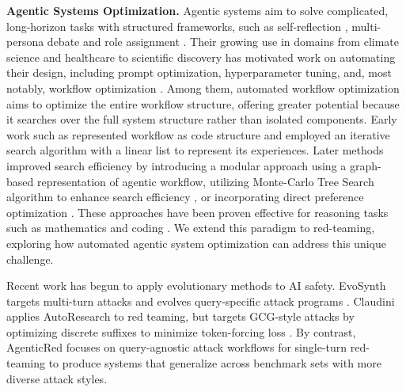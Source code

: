 

\textbf{Agentic Systems Optimization.} Agentic systems aim to solve complicated, long-horizon tasks with structured frameworks, such as self-reflection \citep{madaan2023selfrefineiterativerefinementselffeedback}, multi-persona debate \citep{du2023improvingfactualityreasoninglanguage} and role assignment \citep{xu2025expertpromptinginstructinglargelanguage}. %
Their growing use in domains from climate science and healthcare to scientific discovery has motivated work on automating their design, including prompt optimization, hyperparameter tuning, and, most notably, workflow optimization \citep{hou2025investesgmultiagentreinforcementlearning,wang2025medagentproevidencebasedmultimodalmedical,narayanan2024aviary}. Among them, automated workflow optimization aims to optimize the entire workflow structure, offering greater potential because it searches over the full system structure rather than isolated components. Early work such as \citep{hu2025automateddesignagenticsystems} represented workflow as code structure and employed an iterative search algorithm with a linear list to represent its experiences. Later methods \citep{zhang2024aflow} improved search efficiency by introducing a modular approach using a graph-based representation of agentic workflow, utilizing Monte-Carlo Tree Search algorithm to enhance search efficiency \citep{wang2025scoreflow}, or incorporating direct preference optimization \citep{rafailov2024directpreferenceoptimizationlanguage}. These approaches have been proven effective for reasoning tasks such as mathematics and coding \citep{cobbe2021gsm8k,austin2021program}. We extend this paradigm to red-teaming, exploring how automated agentic system optimization can address this unique challenge.

Recent work has begun to apply evolutionary methods to AI safety. EvoSynth targets multi-turn attacks and evolves query-specific attack programs \citep{chen2025evolve}. Claudini applies AutoResearch to red teaming, but targets GCG-style attacks by optimizing discrete suffixes to minimize token-forcing loss \citep{panfilov2026claudiniautoresearchdiscoversstateoftheart,karpathy2026autoresearch}. By contrast, AgenticRed focuses on query-agnostic attack workflows for single-turn red-teaming to produce systems that  generalize across benchmark sets with more diverse attack styles.